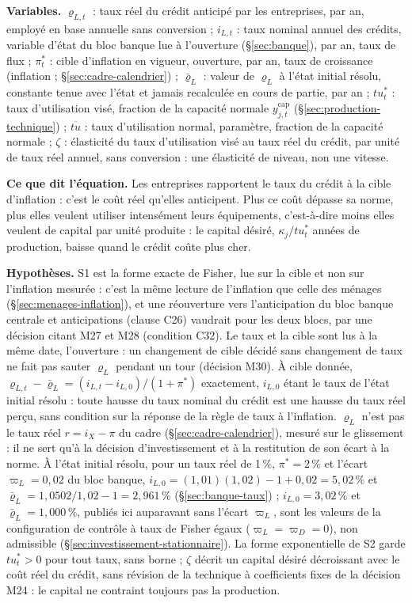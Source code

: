 \documentclass[11pt,a4paper]{article}
\newcommand{\variables}{\par\noindent\textbf{Variables.} }
\newcommand{\sens}{\par\noindent\textbf{Ce que dit l'équation.} }
\newcommand{\hyp}{\par\noindent\textbf{Hypothèses.} }
\begin{document}
\begin{proposee}
\variables $\varrho_{L,t}$ : taux réel du crédit anticipé par les entreprises, par an, employé en base annuelle sans conversion ; $i_{L,t}$ : taux nominal annuel des crédits, variable d'état du bloc banque lue à l'ouverture (\S\ref{sec:banque}), par an, taux de flux ; $\pi^\ast_t$ : cible d'inflation en vigueur, ouverture, par an, taux de croissance (inflation ; \S\ref{sec:cadre-calendrier}) ; $\bar\varrho_L$ : valeur de $\varrho_L$ à l'état initial résolu, constante tenue avec l'état et jamais recalculée en cours de partie, par an ; $\mathit{tu}^\ast_t$ : taux d'utilisation visé, fraction de la capacité normale $y^{\mathrm{cap}}_{j,t}$ (\S\ref{sec:production-technique}) ; $\overline{\mathit{tu}}$ : taux d'utilisation normal, paramètre, fraction de la capacité normale ; $\zeta$ : élasticité du taux d'utilisation visé au taux réel du crédit, par unité de taux réel annuel, sans conversion : une élasticité de niveau, non une vitesse.
\sens Les entreprises rapportent le taux du crédit à la cible d'inflation : c'est le coût réel qu'elles anticipent. Plus ce coût dépasse sa norme, plus elles veulent utiliser intensément leurs équipements, c'est-à-dire moins elles veulent de capital par unité produite : le capital désiré, $\kappa_j/\mathit{tu}^\ast_t$ années de production, baisse quand le crédit coûte plus cher.
\hyp S1 est la forme exacte de Fisher, lue sur la cible et non sur l'inflation mesurée : c'est la même lecture de l'inflation que celle des ménages (\S\ref{sec:menages-inflation}), et une réouverture vers l'anticipation du bloc banque centrale et anticipations (clause C26) vaudrait pour les deux blocs, par une décision citant M27 et M28 (condition C32). Le taux et la cible sont lus à la même date, l'ouverture : un changement de cible décidé sans changement de taux ne fait pas sauter $\varrho_L$ pendant un tour (décision M30). À cible donnée, $\varrho_{L,t} - \bar\varrho_L = (i_{L,t} - i_{L,0})/(1 + \pi^\ast)$ exactement, $i_{L,0}$ étant le taux de l'état initial résolu : toute hausse du taux nominal du crédit est une hausse du taux réel perçu, sans condition sur la réponse de la règle de taux à l'inflation. $\varrho_L$ n'est pas le taux réel $r = i_X - \pi$ du cadre (\S\ref{sec:cadre-calendrier}), mesuré sur le glissement : il ne sert qu'à la décision d'investissement et à la restitution de son écart à la norme. À l'état initial résolu, pour un taux réel de 1\,\%, $\pi^\ast = 2\,\%$ et l'écart $\varpi_L = 0{,}02$ du bloc banque, $i_{L,0} = (1{,}01)(1{,}02) - 1 + 0{,}02 = 5{,}02\,\%$ et $\bar\varrho_L = 1{,}0502/1{,}02 - 1 = 2{,}961\,\%$ (\S\ref{sec:banque-taux}) ; $i_{L,0} = 3{,}02\,\%$ et $\bar\varrho_L = 1{,}000\,\%$, publiés ici auparavant sans l'écart $\varpi_L$, sont les valeurs de la configuration de contrôle à taux de Fisher égaux ($\varpi_L = \varpi_D = 0$), non admissible (\S\ref{sec:investissement-stationnaire}). La forme exponentielle de S2 garde $\mathit{tu}^\ast_t > 0$ pour tout taux, sans borne ; $\zeta$ décrit un capital désiré décroissant avec le coût réel du crédit, sans révision de la technique à coefficients fixes de la décision M24 : le capital ne contraint toujours pas la production.

\end{proposee}
\end{document}
